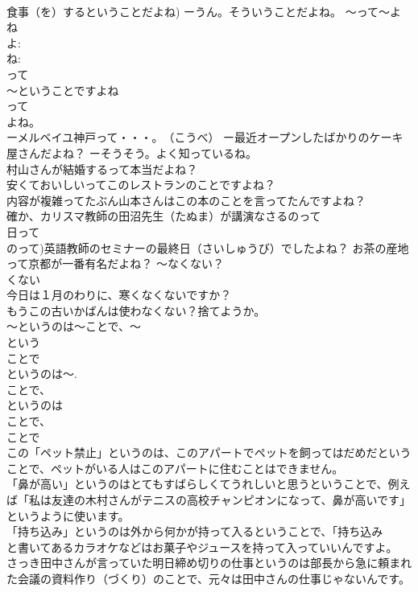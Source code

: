 \documentclass[8pt]{extreport}
\begin{document}
\begin{CJK}{UTF8}{min}
\\	食事（を）するということだよね) ーうん。そういうことだよね。 ～って～よね 
\\	よ:
\\	ね:
\\	って 
\\	～ということですよね 
\\	って
\\	よね。 
\\	ーメルベイユ神戸って・・・。　（こうべ） ー最近オープンしたばかりのケーキ屋さんだよね？ ーそうそう。よく知っているね。 
\\	村山さんが結婚するって本当だよね？ 
\\	安くておいしいってこのレストランのことですよね？ 
\\	内容が複雑ってたぶん山本さんはこの本のことを言ってたんですよね？ 
\\	確か、カリスマ教師の田沼先生（たぬま）が講演なさるのって
\\	日って 
\\	のって)英語教師のセミナーの最終日（さいしゅうび）でしたよね？ お茶の産地って京都が一番有名だよね？ ～なくない？ 
\\	くない 
\\	今日は１月のわりに、寒くなくないですか？ 
\\	もうこの古いかばんは使わなくない？捨てようか。 
\\	～というのは～ことで、～ 
\\	という 
\\	ことで 
\\	というのは～. 
\\	ことで、 
\\	というのは
\\	ことで、
\\	ことで 
\\	この「ペット禁止」というのは、このアパートでペットを飼ってはだめだということで、ペットがいる人はこのアパートに住むことはできません。 
\\	「鼻が高い」というのはとてもすばらしくてうれしいと思うということで、例えば「私は友達の木村さんがテニスの高校チャンピオンになって、鼻が高いです」というように使います。 
\\	「持ち込み」というのは外から何かが持って入るということで、「持ち込み
\\	と書いてあるカラオケなどはお菓子やジュースを持って入っていいんですよ。 
\\	さっき田中さんが言っていた明日締め切りの仕事というのは部長から急に頼まれた会議の資料作り（づくり）のことで、元々は田中さんの仕事じゃないんです。 

\end{CJK}
\end{document}
